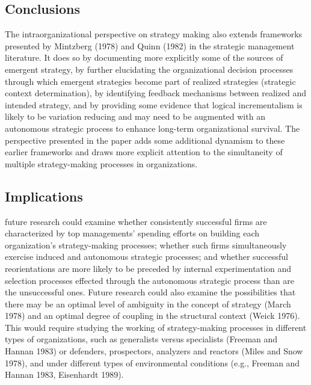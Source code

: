 \documentclass[12pt,letterpaper]{article}
\begin{document}
\subsection{\cite{Burgelman1991} Conclusions}
The intraorganizational perspective on strategy making also extends frameworks presented by Mintzberg (1978) and Quinn (1982) in the strategic management literature. It does so by documenting more explicitly some of the sources of emergent strategy, by further elucidating the organizational decision processes through which emergent strategies become part of realized strategies (strategic context determination), by identifying feedback mechanisms between realized and intended strategy, and by providing some evidence that logical incrementalism is likely to be variation reducing and may need to be augmented with an autonomous strategic process to enhance long-term organizational survival. The perspective presented in the paper adds some additional dynamism to these earlier frameworks and draws more explicit attention to the simultaneity of multiple strategy-making processes in organizations.

\subsection{\cite{Burgelman1991} Implications}
future research could examine whether consistently successful firms are characterized by top managements' spending efforts on building each organization's strategy-making processes; whether such firms simultaneously exercise induced and autonomous strategic processes; and whether successful reorientations are more likely to be preceded by internal experimentation and selection processes effected through the autonomous strategic process than are the unsuccessful ones. Future research could also examine the possibilities that there may be an optimal level of ambiguity in the concept of strategy (March 1978) and an optimal degree of coupling in the structural context (Weick 1976). This would require studying the working of strategy-making processes in different types of organizations, such as generalists versus specialists (Freeman and Hannan 1983) or defenders, prospectors, analyzers and reactors (Miles and Snow 1978), and under different types of environmental conditions (e.g., Freeman and Hannan 1983, Eisenhardt 1989). 
\end{document}
